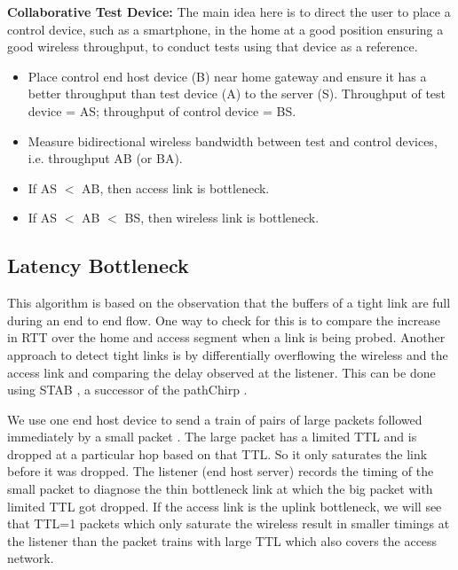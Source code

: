 \textbf{Collaborative Test Device:} The main idea here is to direct the user to place a control device, such as a smartphone, in the home at a good position ensuring a good wireless throughput, to conduct tests using that device as a reference. %
\begin{itemize}[noitemsep,topsep=0pt,parsep=0pt,partopsep=0pt]
\item Place control end host device (B) near home gateway and ensure it has a better throughput than test device (A) to the server (S). Throughput of test device = AS; throughput of control device = BS.
\item Measure bidirectional wireless bandwidth between test and control devices, i.e. throughput AB (or BA).
\item If AS $<$ AB, then access link is bottleneck.%
\item If AS $<$ AB $<$ BS, then wireless link is bottleneck.%
\end{itemize}


\subsection{Latency Bottleneck}
\label{latency}

This algorithm is based on the observation that the buffers of a tight link are full during an end to end flow. One way to check for this is to compare the increase in RTT over the home and access segment when a link is being probed. Another approach to detect tight links is by differentially overflowing the wireless and the access link and comparing the delay observed at the listener. This can be done using STAB \cite{stab}, a successor of the pathChirp \cite{pathchirp}.

We use one end host device to send a train of pairs of large packets followed immediately by a small packet . The large packet has a limited TTL and is dropped at a particular hop based on that TTL. So it only saturates the link before it was dropped. The listener (end host server) records the timing of the small packet to diagnose the thin bottleneck link at which the big packet with limited TTL got dropped. If the access link is the uplink bottleneck, we will see that TTL=1 packets which only saturate the wireless result in smaller timings at the listener than the packet trains with large TTL which also covers the access network.